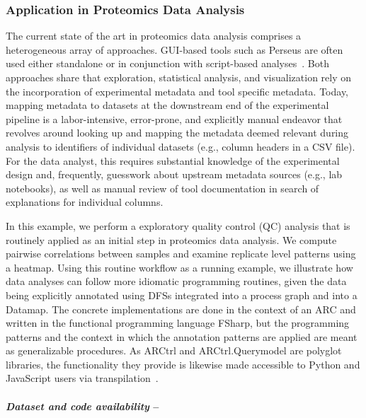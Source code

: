 \documentclass{jib}
\begin{document}
%
%
\subsubsection{Application in Proteomics Data Analysis}

The current state of the art in proteomics data analysis comprises a heterogeneous array of approaches. GUI-based tools such as Perseus are often used either standalone or in conjunction with script-based analyses~\cite{tyanova2016perseus}. Both approaches share that exploration, statistical analysis, and visualization rely on the incorporation of experimental metadata and tool specific metadata. Today, mapping metadata to datasets at the downstream end of the experimental pipeline is a labor-intensive, error-prone, and explicitly manual endeavor that revolves around looking up and mapping the metadata deemed relevant during analysis to identifiers of individual datasets (e.g., column headers in a CSV file). For the data analyst, this requires substantial knowledge of the experimental design and, frequently, guesswork about upstream metadata sources (e.g., lab notebooks), as well as manual review of tool documentation in search of explanations for individual columns. 

In this example, we perform a exploratory quality control (QC) analysis that is routinely applied as an initial step in proteomics data analysis. We compute pairwise correlations between samples and examine replicate level patterns using a heatmap. Using this routine workflow as a running example, we illustrate how data analyses can follow more idiomatic programming routines, given the data being explicitly annotated using DFSs integrated into a process graph and into a Datamap. The concrete implementations are done in the context of an ARC and written in the functional programming language FSharp, but the programming patterns and the context in which the annotation patterns are applied are meant as generalizable procedures. As ARCtrl and ARCtrl.Querymodel are polyglot libraries, the functionality they provide is likewise made accessible to Python and JavaScript users via transpilation~\cite{weil2025arctrl, weil2025arcquerymodel}.


\paragraph{\emph{Dataset and code availability} –}
\end{document}
